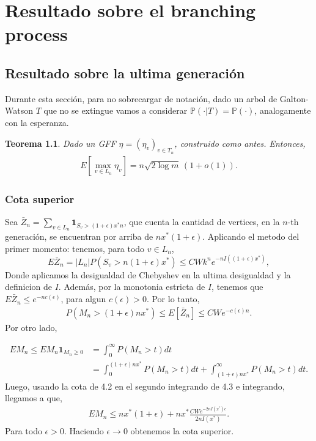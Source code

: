 \documentclass[12pt]{report}
\newtheorem{theorem}{Teorema}  %
\begin{document}
\chapter{Resultado sobre el branching process}
\section{Resultado sobre la ultima generación}
Durante esta sección, para no sobrecargar de notación, dado un arbol de Galton-Watson $T$ que no se extingue 
vamos a considerar $\mathbb{P}(\cdot|T) = \mathbb{P}(\cdot)$, analogamente con la esperanza.
\begin{theorem}
Dado un GFF $\eta = (\eta_{v})_{v \in T_{n}}$, construido como antes. Entonces,
\begin{align} 
E[\max_{v \in L_n} \eta_v] = n\sqrt{2\log m} \, (1 + o(1)).
\end{align}
\end{theorem}

\subsection{Cota superior}

Sea $\bar{Z}_n = \sum_{v \in L_n} \mathbf{1}_{S_v > (1 + \epsilon)x^* n}$, 
que cuenta la cantidad de vertices, en la $n$-th generación, 
se encuentran por arriba de $n x^*(1 + \epsilon)$. Aplicando el metodo del primer momento: 
tenemos, para todo $v \in L_n$,
\[
E\bar{Z}_n = |L_n| P(S_v > n(1 + \epsilon)x^*) \leq CW k^n e^{-n I((1 + \epsilon)x^*)},
\]
Donde aplicamos la desigualdad de Chebyshev en la ultima desigualdad y la definicion de $I$. Además, por 
la monotonia estricta de $I$, tenemos que $E \bar{Z}_n \leq e^{-n c(\epsilon)}$, 
para algun $c(\epsilon) > 0$. Por lo tanto,
\begin{align}
P(M_n > (1 + \epsilon) n x^*) \leq E [\bar{Z}_n] \leq CWe^{-c(\epsilon)n}.
\end{align}
Por otro lado,

\begin{align}
EM_n \leq EM_n\mathbf{1}_{M_n \geq 0} &= \int_{0}^{\infty} P(M_n > t) dt \nonumber\\
&= \int_{0}^{(1+\epsilon)nx^*} P(M_n > t) dt + \int_{(1+\epsilon)nx^*}^{\infty} P(M_n > t) dt .\nonumber
\end{align}
Luego, usando la cota de 4.2 en el segundo integrando de 4.3 e integrando, llegamos a que,
\begin{align}
EM_n \leq nx^*(1+\epsilon) + nx^* \frac{CWe^{-2nI(x^*)\epsilon}}{2nI(x^*)}.
\end{align}
Para todo $\epsilon > 0$. Haciendo $\epsilon \to 0$ obtenemos la cota superior.
\end{document}
